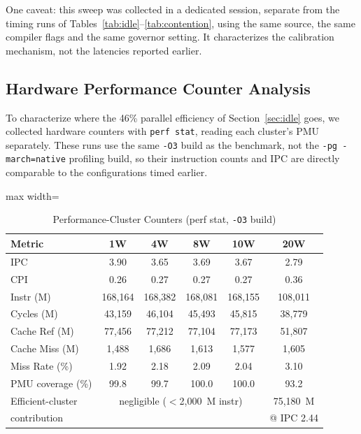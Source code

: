 \documentclass[conference]{IEEEtran}
\begin{document}
One caveat: this sweep was collected in a dedicated session, separate from the timing runs of Tables~\ref{tab:idle}--\ref{tab:contention}, using the same source, the same compiler flags and the same governor setting. It characterizes the calibration mechanism, not the latencies reported earlier.

\subsection{Hardware Performance Counter Analysis}
\label{sec:perfcounter}
To characterize where the 46\% parallel efficiency of Section~\ref{sec:idle} goes, we collected hardware counters with \texttt{perf stat}, reading each cluster's PMU separately. These runs use the same \texttt{-O3} build as the benchmark, not the \texttt{-pg -march=native} profiling build, so their instruction counts and IPC are directly comparable to the configurations timed earlier.

\begin{table}[htbp]
\caption{Performance-Cluster Counters (perf stat, \texttt{-O3} build)}
\begin{center}
\small
\begin{adjustbox}{max width=\columnwidth}
\begin{tabular}{|l|c|c|c|c|c|}
\hline
\textbf{Metric} & \textbf{1W} & \textbf{4W} & \textbf{8W} & \textbf{10W} & \textbf{20W} \\
\hline
IPC & 3.90 & 3.65 & 3.69 & 3.67 & 2.79 \\
CPI & 0.26 & 0.27 & 0.27 & 0.27 & 0.36 \\
Instr (M) & 168,164 & 168,382 & 168,081 & 168,155 & 108,011 \\
Cycles (M) & 43,159 & 46,104 & 45,493 & 45,815 & 38,779 \\
Cache Ref (M) & 77,456 & 77,212 & 77,104 & 77,173 & 51,807 \\
Cache Miss (M) & 1,488 & 1,686 & 1,613 & 1,577 & 1,605 \\
Miss Rate (\%) & 1.92 & 2.18 & 2.09 & 2.04 & 3.10 \\
PMU coverage (\%) & 99.8 & 99.7 & 100.0 & 100.0 & 93.2 \\
\hline
Efficient-cluster & \multicolumn{4}{c|}{negligible ($<$2,000~M instr)} & 75,180~M \\
contribution & \multicolumn{4}{c|}{} & @ IPC 2.44 \\
\hline
\end{tabular}
\end{adjustbox}
\label{tab:perf}
\end{center}
\end{table}
\end{document}
